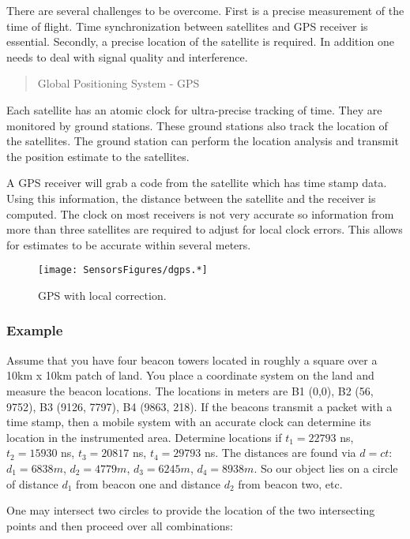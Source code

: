 There are several challenges to be overcome. First is a precise
measurement of the time of flight. Time synchronization between
satellites and GPS receiver is essential. Secondly, a precise location
of the satellite is required. In addition one needs to deal with signal
quality and interference.

\begin{quote}
Global Positioning System - GPS
\end{quote}

Each satellite has an atomic clock for ultra-precise tracking of time.
They are monitored by ground stations. These ground stations also track
the location of the satellites. The ground station can perform the
location analysis and transmit the position estimate to the satellites.

A GPS receiver will grab a code from the satellite which has time stamp
data. Using this information, the distance between the satellite and the
receiver is computed. The clock on most receivers is not very accurate
so information from more than three satellites are required to adjust
for local clock errors. This allows for estimates to be accurate within
several meters.

\begin{figure}
\centering
\texttt{[image: SensorsFigures/dgps.*]}
\caption{GPS with local correction.}
\end{figure}

\hypertarget{example}{%
\subsubsection{Example}\label{example}}

Assume that you have four beacon towers located in roughly a square over
a 10km x 10km patch of land. You place a coordinate system on the land
and measure the beacon locations. The locations in meters are B1 (0,0),
B2 (56, 9752), B3 (9126, 7797), B4 (9863, 218). If the beacons transmit
a packet with a time stamp, then a mobile system with an accurate clock
can determine its location in the instrumented area. Determine locations
if \(t_1 = 22793\) ns, \(t_2 = 15930\) ns, \(t_3 = 20817\) ns,
\(t_4 =  29793\) ns. The distances are found via \(d = ct\):
\(d_1 = 6838 m\), \(d_2 = 4779 m\), \(d_3 = 6245 m\), \(d_4 = 8938 m\).
So our object lies on a circle of distance \(d_1\) from beacon one and
distance \(d_2\) from beacon two, etc.

One may intersect two circles to provide the location of the two
intersecting points and then proceed over all combinations:

